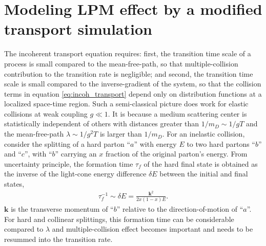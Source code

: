 \documentclass[aps, prc, reprint, amsmath, groupedaddress, nofootinbib]{revtex4-1}
\begin{document}
\section{Modeling LPM effect by a modified transport simulation}\label{section:modified-Boltzmann}
The incoherent transport equation requires: first, the transition time scale of a process is small compared to the mean-free-path, so that multiple-collision contribution to the transition rate is negligible; and second, the transition time scale is small compared to the inverse-gradient of the system, so that the collision terms in equation \ref{eq:incoh_transport} depend only on distribution functions at a localized space-time region.
Such a semi-classical picture does work for elastic collisions at weak coupling $g\ll 1$. 
It is because a medium scattering center is statistically independent of others with distances greater than $1/m_D\sim 1/gT$ and the mean-free-path $\lambda \sim 1/g^2T$ is larger than $1/m_D$.
For an inelastic collision, consider the splitting of a hard parton ``$a$'' with energy $E$ to two hard partons ``$b$'' and ``$c$'', with ``$b$'' carrying an $x$ fraction of the original parton's energy.
From uncertainty principle, the formation time $\tau_f$ of the hard final state is obtained as the inverse of the light-cone energy difference $\delta E$ between the initial and final states,
\begin{eqnarray}
\tau_f^{-1} \sim \delta E = \frac{\mathbf{k}^2}{2x(1-x)E}.
\label{eq:tauf}
\end{eqnarray}
$\mathbf{k}$ is the transverse momentum of ``$b$'' relative to the direction-of-motion of ``$a$''.
For hard and collinear splittings, this formation time can be considerable compared to $\lambda$ and multiple-collision effect becomes important and needs to be resummed into the transition rate.
\end{document}
